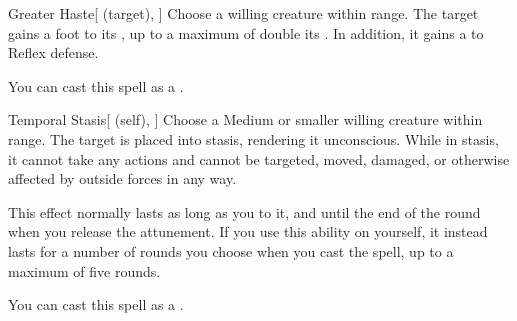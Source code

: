 \lowercase{\hypertarget{spell:Greater Haste}{}}\label{spell:Greater Haste}
\begin{ability}[\nth{3}]{\hypertarget{spell:Greater Haste}{Greater Haste}}[ (target), ]
Choose a willing creature within \rngmed range.
The target gains a  foot  to its , up to a maximum of double its .
In addition, it gains a   to Reflex defense.

You can cast this spell as a .
\end{ability}
\vspace{0.25em}



\lowercase{\hypertarget{spell:Temporal Stasis}{}}\label{spell:Temporal Stasis}
\begin{ability}[\nth{3}]{\hypertarget{spell:Temporal Stasis}{Temporal Stasis}}[ (self), ]
Choose a Medium or smaller willing creature within \rngmed range.
The target is placed into stasis, rendering it unconscious.
While in stasis, it cannot take any actions and cannot be targeted, moved, damaged, or otherwise affected by outside forces in any way.

This effect normally lasts as long as you  to it, and until the end of the round when you release the attunement.
If you use this ability on yourself, it instead lasts for a number of rounds you choose when you cast the spell, up to a maximum of five rounds.

You can cast this spell as a .
\end{ability}
\vspace{0.25em}



